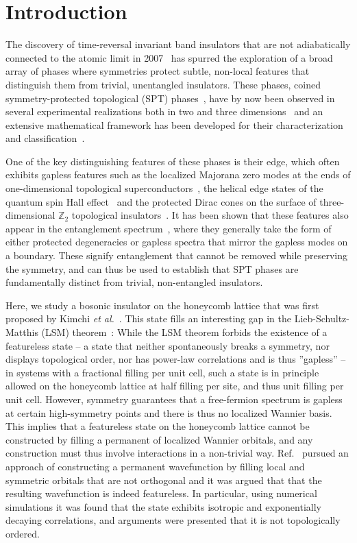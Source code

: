 
\section{Introduction}

The discovery of time-reversal invariant band insulators that are not adiabatically connected to the atomic limit in 2007~\cite{...}
has spurred the exploration of a broad array of phases where symmetries protect subtle, non-local features that distinguish
them from trivial, unentangled insulators. These phases, coined symmetry-protected topological (SPT) phases~\cite{...}, have
by now been observed in several experimental realizations both in two and three dimensions~\cite{somereview} and an extensive
mathematical framework has been developed for their characterization and classification~\cite{wen...}.

One of the key distinguishing features of these phases is their edge, which often exhibits gapless features such as the localized
Majorana zero modes at the ends of one-dimensional topological superconductors~\cite{kitaev2001},
the helical edge states of the quantum spin Hall effect~\cite{...} and the protected Dirac cones on the surface of three-dimensional
$\mathbb{Z}_2$ topological insulators~\cite{...}.
It has been shown that these features also appear in the entanglement spectrum~\cite{li2008}, where they generally take the form
of either protected degeneracies or gapless spectra that mirror the gapless modes on a boundary.
These signify entanglement that cannot be removed while preserving the symmetry, and can thus be used to establish
that SPT phases are fundamentally distinct from trivial, non-entangled insulators.

Here, we study a bosonic insulator on the honeycomb lattice that was first proposed by Kimchi {\it et al.}~\cite{kimchi2013}.
This state fills an interesting gap in the Lieb-Schultz-Matthis (LSM) theorem~\cite{...}:
While the LSM theorem forbids the existence of a featureless state
-- a state that neither spontaneously breaks a symmetry, nor displays topological
order, nor has power-law correlations and is thus ''gapless'' -- in systems
with a fractional filling per unit cell, such a state is in principle allowed on the honeycomb lattice
at half filling per site, and thus unit filling per unit cell. However, symmetry guarantees that
a free-fermion spectrum is gapless at certain high-symmetry points and there is
thus no localized Wannier basis.
This implies that a featureless state on the honeycomb lattice cannot be constructed by filling a permanent of localized Wannier
orbitals, and any construction must thus involve interactions in a non-trivial way. Ref.~ pursued
an approach of constructing a permanent wavefunction by filling local and symmetric
orbitals that are not orthogonal and
it was argued that that the resulting wavefunction is indeed featureless.
In particular, using numerical simulations it was found that the state exhibits
isotropic and exponentially decaying correlations, and arguments were presented that it is not
topologically ordered.

